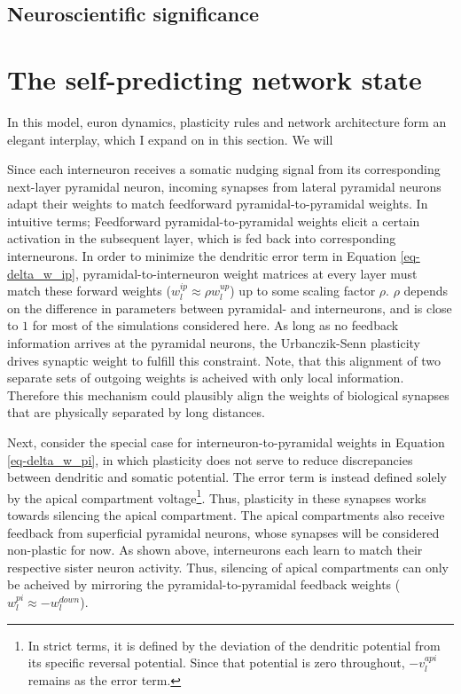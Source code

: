 \subsection{Neuroscientific significance}



\section{The self-predicting network state}\label{sec-selfpred}

In this model, euron dynamics, plasticity rules and network architecture form an elegant interplay, which I expand on in
this section. We will

Since each interneuron receives a somatic nudging signal from its corresponding next-layer pyramidal neuron, incoming
synapses from lateral pyramidal neurons adapt their weights to match feedforward pyramidal-to-pyramidal weights. In
intuitive terms; Feedforward pyramidal-to-pyramidal weights elicit a certain activation in the subsequent layer, which
is fed back into corresponding interneurons. In order to minimize the dendritic error term in Equation
\ref{eq-delta_w_ip}, pyramidal-to-interneuron weight matrices at every layer must match these forward weights ($w_l^{ip}
\approx \rho w_l^{up}$) up to some scaling factor $\rho$. $\rho$ depends on the difference in parameters between
pyramidal- and interneurons, and is close to $1$ for most of the simulations considered here. As long as no feedback
information arrives at the pyramidal neurons, the Urbanczik-Senn plasticity drives synaptic weight to fulfill this
constraint. Note, that this alignment of two separate sets of outgoing weights is acheived with only local information.
Therefore this mechanism could plausibly align the weights of biological synapses that are physically separated by long
distances. \newline

Next, consider the special case for interneuron-to-pyramidal weights in Equation \ref{eq-delta_w_pi}, in which
plasticity does not serve to reduce discrepancies between dendritic and somatic potential. The error term is instead
defined solely by the apical compartment voltage\footnote{In strict terms, it is defined by the deviation of the
dendritic potential from its specific reversal potential. Since that potential is zero throughout, $- v_l^{api}$ remains
as the error term.}. Thus, plasticity in these synapses works towards silencing the apical compartment. The apical
compartments also receive feedback from superficial pyramidal neurons, whose synapses will be considered non-plastic for
now. As shown above, interneurons each learn to match their respective sister neuron activity. Thus, silencing of apical
compartments can only be acheived by mirroring the pyramidal-to-pyramidal feedback weights ($w_l^{pi} \approx
-w_l^{down}$).\newline

